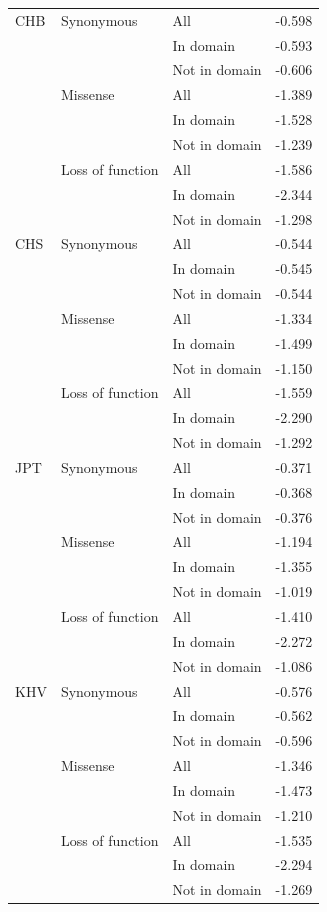 \documentclass[]{article}
\begin{document}
\begin{longtable}[t]{lllr}
CHB & Synonymous & All & -0.598\\
 &  & In domain & -0.593\\
 &  & Not in domain & -0.606\\
 & Missense & All & -1.389\\
 &  & In domain & -1.528\\
 &  & Not in domain & -1.239\\
 & Loss of function & All & -1.586\\
 &  & In domain & -2.344\\
 &  & Not in domain & -1.298\\
\addlinespace
CHS & Synonymous & All & -0.544\\
 &  & In domain & -0.545\\
 &  & Not in domain & -0.544\\
 & Missense & All & -1.334\\
 &  & In domain & -1.499\\
 &  & Not in domain & -1.150\\
 & Loss of function & All & -1.559\\
 &  & In domain & -2.290\\
 &  & Not in domain & -1.292\\
\addlinespace
JPT & Synonymous & All & -0.371\\
 &  & In domain & -0.368\\
 &  & Not in domain & -0.376\\
 & Missense & All & -1.194\\
 &  & In domain & -1.355\\
 &  & Not in domain & -1.019\\
 & Loss of function & All & -1.410\\
 &  & In domain & -2.272\\
 &  & Not in domain & -1.086\\
\addlinespace
KHV & Synonymous & All & -0.576\\
 &  & In domain & -0.562\\
 &  & Not in domain & -0.596\\
 & Missense & All & -1.346\\
 &  & In domain & -1.473\\
 &  & Not in domain & -1.210\\
 & Loss of function & All & -1.535\\
 &  & In domain & -2.294\\
 &  & Not in domain & -1.269\\*    
\end{longtable}
\end{document}
